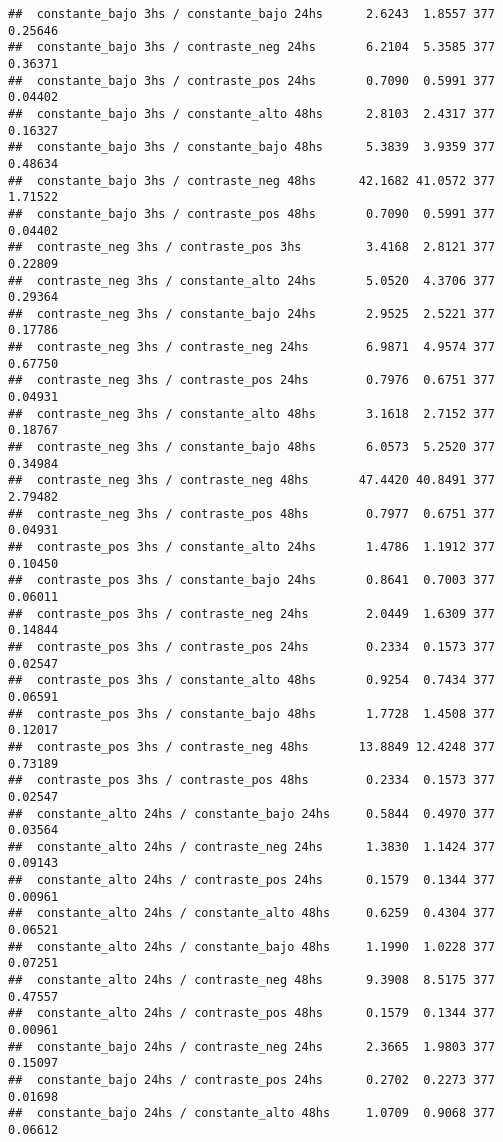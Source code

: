 \documentclass[
]{article}
\begin{document}
\begin{verbatim}
##  constante_bajo 3hs / constante_bajo 24hs      2.6243  1.8557 377  0.25646
##  constante_bajo 3hs / contraste_neg 24hs       6.2104  5.3585 377  0.36371
##  constante_bajo 3hs / contraste_pos 24hs       0.7090  0.5991 377  0.04402
##  constante_bajo 3hs / constante_alto 48hs      2.8103  2.4317 377  0.16327
##  constante_bajo 3hs / constante_bajo 48hs      5.3839  3.9359 377  0.48634
##  constante_bajo 3hs / contraste_neg 48hs      42.1682 41.0572 377  1.71522
##  constante_bajo 3hs / contraste_pos 48hs       0.7090  0.5991 377  0.04402
##  contraste_neg 3hs / contraste_pos 3hs         3.4168  2.8121 377  0.22809
##  contraste_neg 3hs / constante_alto 24hs       5.0520  4.3706 377  0.29364
##  contraste_neg 3hs / constante_bajo 24hs       2.9525  2.5221 377  0.17786
##  contraste_neg 3hs / contraste_neg 24hs        6.9871  4.9574 377  0.67750
##  contraste_neg 3hs / contraste_pos 24hs        0.7976  0.6751 377  0.04931
##  contraste_neg 3hs / constante_alto 48hs       3.1618  2.7152 377  0.18767
##  contraste_neg 3hs / constante_bajo 48hs       6.0573  5.2520 377  0.34984
##  contraste_neg 3hs / contraste_neg 48hs       47.4420 40.8491 377  2.79482
##  contraste_neg 3hs / contraste_pos 48hs        0.7977  0.6751 377  0.04931
##  contraste_pos 3hs / constante_alto 24hs       1.4786  1.1912 377  0.10450
##  contraste_pos 3hs / constante_bajo 24hs       0.8641  0.7003 377  0.06011
##  contraste_pos 3hs / contraste_neg 24hs        2.0449  1.6309 377  0.14844
##  contraste_pos 3hs / contraste_pos 24hs        0.2334  0.1573 377  0.02547
##  contraste_pos 3hs / constante_alto 48hs       0.9254  0.7434 377  0.06591
##  contraste_pos 3hs / constante_bajo 48hs       1.7728  1.4508 377  0.12017
##  contraste_pos 3hs / contraste_neg 48hs       13.8849 12.4248 377  0.73189
##  contraste_pos 3hs / contraste_pos 48hs        0.2334  0.1573 377  0.02547
##  constante_alto 24hs / constante_bajo 24hs     0.5844  0.4970 377  0.03564
##  constante_alto 24hs / contraste_neg 24hs      1.3830  1.1424 377  0.09143
##  constante_alto 24hs / contraste_pos 24hs      0.1579  0.1344 377  0.00961
##  constante_alto 24hs / constante_alto 48hs     0.6259  0.4304 377  0.06521
##  constante_alto 24hs / constante_bajo 48hs     1.1990  1.0228 377  0.07251
##  constante_alto 24hs / contraste_neg 48hs      9.3908  8.5175 377  0.47557
##  constante_alto 24hs / contraste_pos 48hs      0.1579  0.1344 377  0.00961
##  constante_bajo 24hs / contraste_neg 24hs      2.3665  1.9803 377  0.15097
##  constante_bajo 24hs / contraste_pos 24hs      0.2702  0.2273 377  0.01698
##  constante_bajo 24hs / constante_alto 48hs     1.0709  0.9068 377  0.06612

\end{verbatim}
\end{document}
